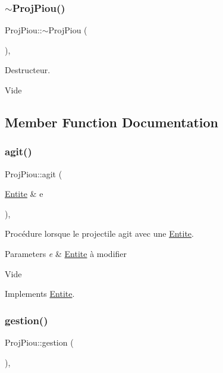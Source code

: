 \subsubsection{\texorpdfstring{$\sim$\+Proj\+Piou()}{~ProjPiou()}}
{\footnotesize\ttfamily Proj\+Piou\+::$\sim$\+Proj\+Piou (\begin{DoxyParamCaption}{ }\end{DoxyParamCaption})\hspace{0.3cm}{\ttfamily [override]}, {\ttfamily [default]}}



Destructeur. 

Vide 

\subsection{Member Function Documentation}
\mbox{\label{class_proj_piou_acbc0bea0b23b3daa311679bec7ffe91a}} 
\subsubsection{\texorpdfstring{agit()}{agit()}}
{\footnotesize\ttfamily Proj\+Piou\+::agit (\begin{DoxyParamCaption}\item[{\mbox{\hyperlink{class_entite}{Entite}} \&}]{e }\end{DoxyParamCaption})\hspace{0.3cm}{\ttfamily [override]}, {\ttfamily [virtual]}}



Procédure lorsque le projectile agit avec une \mbox{\hyperlink{class_entite}{Entite}}. 


\begin{DoxyParams}{Parameters}
{\em e} & \mbox{\hyperlink{class_entite}{Entite}} à modifier\\
\hline
\end{DoxyParams}
Vide 

Implements \mbox{\hyperlink{class_entite_a848ec47afac1d7ba970a2bcab5dc7b3b}{Entite}}.

\mbox{\label{class_proj_piou_aa25660500d188f1085f8289db91a6170}} 
\subsubsection{\texorpdfstring{gestion()}{gestion()}}
{\footnotesize\ttfamily Proj\+Piou\+::gestion (\begin{DoxyParamCaption}{ }\end{DoxyParamCaption})\hspace{0.3cm}{\ttfamily [override]}, {\ttfamily [virtual]}}



